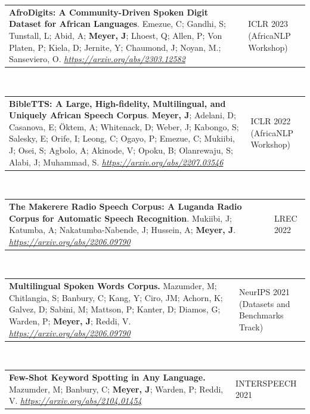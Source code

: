 \documentclass{resume} %
\begin{document}
\vspace{.25cm}

\begin{tabular}{@{}p{}p{}@{}}
  {\bf AfroDigits: A Community-Driven Spoken Digit Dataset for African Languages}.
  {Emezue, C; Gandhi, S; Tunstall, L; Abid, A; \textbf{Meyer, J}; Lhoest, Q; Allen, P; Von Platen, P; Kiela, D; Jernite, Y; Chaumond, J; Noyan, M.; Sanseviero, O}.
  \emph{\url{https://arxiv.org/abs/2303.12582}}
  & {ICLR 2023 (AfricaNLP Workshop)}
\end{tabular}
       \\

\begin{tabular}{@{}p{}p{}@{}}
  {\bf BibleTTS: A Large, High-fidelity, Multilingual, and Uniquely African Speech Corpus}.
  {\textbf{Meyer, J}; Adelani, D; Casanova, E; Öktem, A; Whitenack, D; Weber, J; Kabongo, S; Salesky, E; Orife, I; Leong, C; Ogayo, P; Emezue, C; Mukiibi, J; Osei, S; Agbolo, A; Akinode, V; Opoku, B; Olanrewaju, S; Alabi, J; Muhammad, S}.
  \emph{\url{https://arxiv.org/abs/2207.03546}}
  & {ICLR 2022 (AfricaNLP Workshop)}
\end{tabular}
\\
       
       \begin{tabular}{@{}p{}p{}@{}}
  {\bf The Makerere Radio Speech Corpus: A Luganda Radio Corpus for Automatic Speech Recognition}.
  {Mukiibi, J; Katumba, A; Nakatumba-Nabende, J; Hussein, A; \textbf{Meyer, J}}.
  \emph{\url{https://arxiv.org/abs/2206.09790}}
  &
       {LREC 2022}
\end{tabular}
\\

\begin{tabular}{@{}p{}p{}@{}}
{\bf Multilingual Spoken Words Corpus.}
{Mazumder, M; Chitlangia, S; Banbury, C; Kang, Y; Ciro, JM; Achorn, K; Galvez, D; Sabini, M; Mattson, P; Kanter, D; Diamos, G; Warden, P; \textbf{Meyer, J}; Reddi, V.}
\emph{\url{https://arxiv.org/abs/2206.09790}}
&
     {NeurIPS 2021 (Datasets and Benchmarks Track)}
\end{tabular}
\\

\begin{tabular}{@{}p{}p{}@{}}
  {\bf Few-Shot Keyword Spotting in Any Language.}
  {Mazumder, M; Banbury, C; \textbf{Meyer, J}; Warden, P; Reddi, V.}
  \emph{\url{https://arxiv.org/abs/2104.01454}}
  &
  {INTERSPEECH 2021}
\end{tabular}
\\
\end{document}
